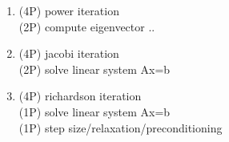 {\color{solution}
\begin{enumerate}
\item \textcolor{exampoints}{(4P)} power iteration\\
\textcolor{exampoints}{(2P)} compute eigenvector ..
\item \textcolor{exampoints}{(4P)} jacobi iteration\\
\textcolor{exampoints}{(2P)} solve linear system Ax=b
\item \textcolor{exampoints}{(4P)} richardson iteration\\
\textcolor{exampoints}{(1P)}  solve linear system Ax=b\\
\textcolor{exampoints}{(1P)} step size/relaxation/preconditioning
\end{enumerate}
}
